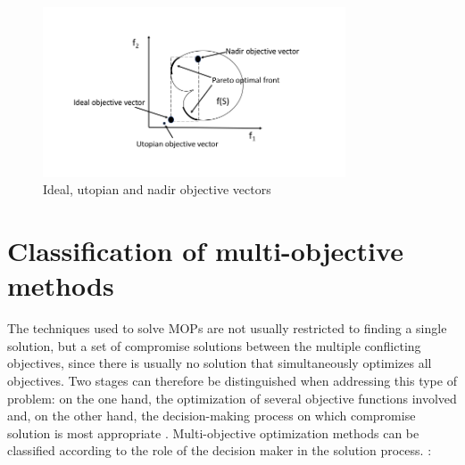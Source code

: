 \begin{figure}[H] %
	\centering 
\includegraphics[width=0.80\textwidth]{figures/multiobjective/vector_ideal_nadir.png}
	\caption{Ideal, utopian and nadir objective vectors} \label{fig:ideal_nadir}
\end{figure} 

\section{Classification of multi-objective methods}
The techniques used to solve MOPs are not usually restricted to finding a single solution, but a set of compromise solutions between the multiple conflicting objectives, since there is usually no solution that simultaneously optimizes all objectives. Two stages can therefore be distinguished when addressing this type of problem: on the one hand, the optimization of several objective functions involved and, on the other hand, the decision-making process on which compromise solution is most appropriate \cite{coello07evolutionary}. Multi-objective optimization methods can be classified according to the role of the decision maker in the solution process.  \cite{cohon75review}:

